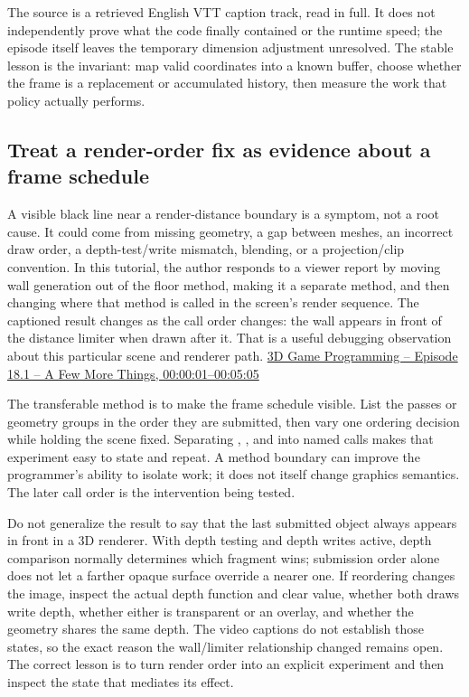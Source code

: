 The source is a retrieved English VTT caption track, read in full. It does not independently prove what the code finally contained or the runtime speed; the episode itself leaves the temporary dimension adjustment unresolved. The stable lesson is the invariant: map valid coordinates into a known buffer, choose whether the frame is a replacement or accumulated history, then measure the work that policy actually performs.

\subsection{Treat a render-order fix as evidence about a frame schedule}\label{03-visual-computing-i-ch004-treat-a-render-order-fix-as-evidence-about-a-frame-schedule}

\hypertarget{03-visual-computing-i-ch004-treat-a-render-order-fix-as-evidence-about-a-frame-schedule}{}

A visible black line near a render-distance boundary is a symptom, not a root cause. It could come from missing geometry, a gap between meshes, an incorrect draw order, a depth-test/write mismatch, blending, or a projection/clip convention. In this tutorial, the author responds to a viewer report by moving wall generation out of the floor method, making it a separate  method, and then changing where that method is called in the screen's render sequence. The captioned result changes as the call order changes: the wall appears in front of the distance limiter when drawn after it. That is a useful debugging observation about this particular scene and renderer path. \href{https://www.youtube.com/watch?v=98K5Bm2sApY&t=1s}{3D Game Programming -- Episode 18.1 -- A Few More Things, 00:00:01--00:05:05}

The transferable method is to make the frame schedule visible. List the passes or geometry groups in the order they are submitted, then vary one ordering decision while holding the scene fixed. Separating , , and  into named calls makes that experiment easy to state and repeat. A method boundary can improve the programmer's ability to isolate work; it does not itself change graphics semantics. The later call order is the intervention being tested.

Do not generalize the result to say that the last submitted object always appears in front in a 3D renderer. With depth testing and depth writes active, depth comparison normally determines which fragment wins; submission order alone does not let a farther opaque surface override a nearer one. If reordering changes the image, inspect the actual depth function and clear value, whether both draws write depth, whether either is transparent or an overlay, and whether the geometry shares the same depth. The video captions do not establish those states, so the exact reason the wall/limiter relationship changed remains open. The correct lesson is to turn render order into an explicit experiment and then inspect the state that mediates its effect.


